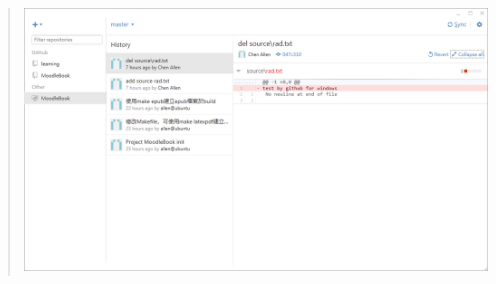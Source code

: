 \documentclass[letterpaper,10pt,english]{sphinxmanual}
\begin{document}
\begin{quote}

\includegraphics{GitHub-AddOtherGit-003.png}
\end{quote}
\end{document}
